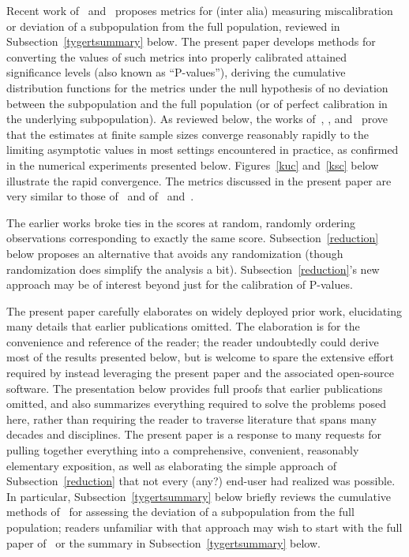 \documentclass[12pt]{article}
\begin{document}
Recent work of~\citet{tygert_full} and~\citet{tygert_two} proposes metrics
for (inter alia) measuring miscalibration or deviation of a subpopulation
from the full population, reviewed in Subsection~\ref{tygertsummary} below.
The present paper develops methods for converting the values of such metrics
into properly calibrated attained significance levels
(also known as ``P-values''), deriving the cumulative distribution functions
for the metrics under the null hypothesis of no deviation between
the subpopulation and the full population (or of perfect calibration
in the underlying subpopulation). As reviewed below,
the works of~\citet{delgado}, \citet{diebolt}, and~\citet{stute}
prove that the estimates at finite sample sizes converge reasonably rapidly
to the limiting asymptotic values in most settings encountered in practice,
as confirmed in the numerical experiments presented below.
Figures~\ref{kuc} and~\ref{ksc} below illustrate the rapid convergence.
The metrics discussed in the present paper are very similar
to those of~\citet{kuiper} and of~\citet{kolmogorov} and~\citet{smirnov}.

The earlier works broke ties in the scores at random,
randomly ordering observations corresponding to exactly the same score.
Subsection~\ref{reduction} below proposes an alternative that avoids
any randomization (though randomization does simplify the analysis a bit).
Subsection~\ref{reduction}'s new approach may be of interest beyond just
for the calibration of P-values.

The present paper carefully elaborates on widely deployed prior work,
elucidating many details that earlier publications omitted.
The elaboration is for the convenience and reference of the reader;
the reader undoubtedly could derive most of the results presented below,
but is welcome to spare the extensive effort required by instead leveraging
the present paper and the associated open-source software.
The presentation below provides full proofs that earlier publications omitted,
and also summarizes everything required to solve the problems posed here,
rather than requiring the reader to traverse literature
that spans many decades and disciplines.
The present paper is a response to many requests for pulling together
everything into a comprehensive, convenient, reasonably elementary exposition,
as well as elaborating the simple approach of Subsection~\ref{reduction}
that not every (any?) end-user had realized was possible.
In particular, Subsection~\ref{tygertsummary} below briefly reviews
the cumulative methods of~\citet{tygert_full}
for assessing the deviation of a subpopulation from the full population;
readers unfamiliar with that approach may wish to start
with the full paper of~\citet{tygert_full} or the summary
in Subsection~\ref{tygertsummary} below.
\end{document}
